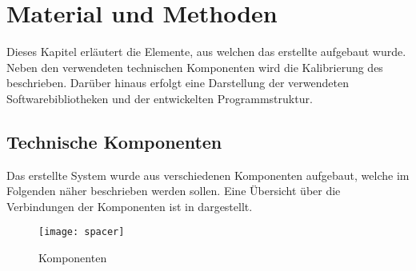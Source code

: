 \chapter{Material und Methoden}
\label{chap.material}
Dieses Kapitel erläutert die Elemente, aus welchen das erstellte \kps{} aufgebaut wurde. Neben den verwendeten technischen Komponenten wird die Kalibrierung des  beschrieben. Darüber hinaus erfolgt eine Darstellung der verwendeten Softwarebibliotheken und der entwickelten Programmstruktur.

\section{Technische Komponenten}
Das erstellte System wurde aus verschiedenen Komponenten aufgebaut, welche im Folgenden näher beschrieben werden sollen. Eine Übersicht über die Verbindungen der Komponenten ist in  dargestellt.

\begin{figure}[ht]
	\begin{center}
		\texttt{[image: spacer]}
		\caption{Komponenten}
		\label{fig.components}
	\end{center}
\end{figure}

\prever{
}

\prever{
}

